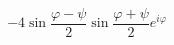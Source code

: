 \begin{displaymath}
 -4\sin\frac{\varphi - \psi}{2}\sin\frac{\varphi + \psi}{2}e^{i\varphi}
\end{displaymath}



